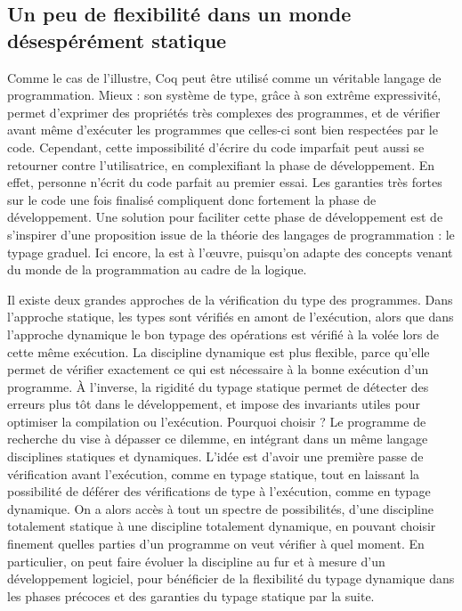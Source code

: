 \subsection{Un peu de flexibilité dans un monde désespérément statique}
\label{sec:intro-graduel}

Comme le cas de  l’illustre, Coq peut être utilisé comme un véritable langage
de programmation. Mieux : son système de type, grâce à son extrême expressivité, 
permet d’exprimer des propriétés très complexes des programmes, et de vérifier
avant même d’exécuter les programmes que celles-ci sont bien respectées par le code.
Cependant, cette impossibilité d’écrire du code imparfait peut aussi se retourner contre l’utilisatrice, en complexifiant la phase de développement.
En effet, personne n’écrit du code parfait au premier essai. Les garanties très
fortes sur le code une fois finalisé compliquent donc 
fortement la phase de développement.
Une solution pour faciliter cette phase de développement
est de s’inspirer d’une proposition issue de la théorie des langages de
programmation : le typage graduel. Ici encore, la 
est à l’œuvre, puisqu’on adapte des concepts venant du monde de la programmation
au cadre de la logique.

Il existe deux grandes approches de la vérification du type des programmes.
Dans l’approche statique,
les types sont vérifiés en amont de l’exécution, alors que dans l’approche dynamique le bon typage des opérations est vérifié à la volée lors de cette même exécution.
La discipline dynamique est plus flexible, parce qu’elle permet de vérifier exactement ce qui est nécessaire à la bonne exécution d’un programme.
À l’inverse, la rigidité du typage statique permet de détecter des erreurs plus tôt dans le développement, et impose des invariants utiles pour optimiser la compilation ou l’exécution.
Pourquoi choisir ? Le programme de recherche du   vise à dépasser ce dilemme, en intégrant dans un même langage disciplines statiques et dynamiques.
L’idée est d’avoir une première passe de vérification avant l’exécution, comme en typage statique, tout en laissant la possibilité de déférer des vérifications de type à l’exécution, comme en typage dynamique.
On a alors accès à tout un spectre de possibilités, d’une discipline totalement statique à une discipline totalement dynamique,
en pouvant choisir finement quelles parties d’un programme on veut vérifier à quel moment. En particulier, on peut faire évoluer la discipline au fur et à mesure d’un développement logiciel, pour bénéficier de la flexibilité du typage dynamique dans les phases précoces et des garanties du typage statique par la suite.

